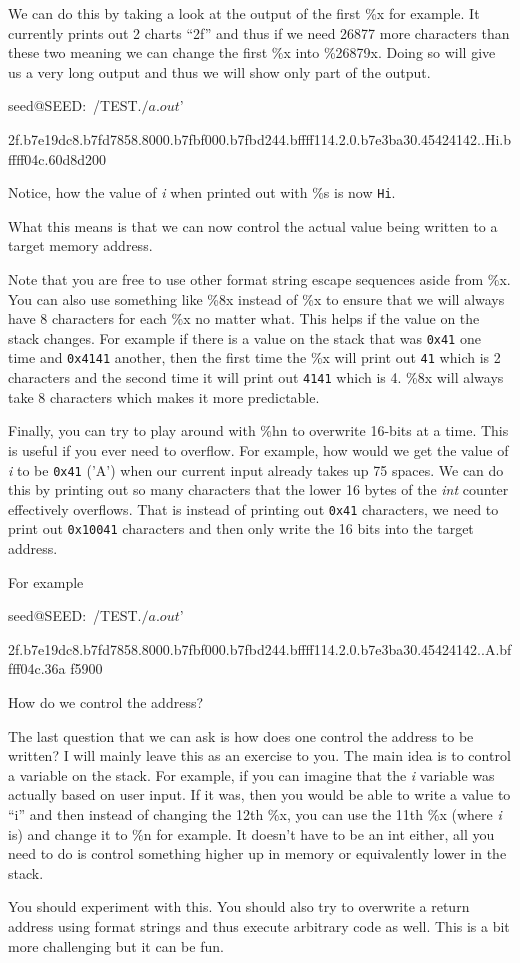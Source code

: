 We can do this by taking a look at the output of the first \%x for example. It currently prints out 2 charts “2f” and thus if we need 26877 more characters than these two meaning we can change 
the first \%x into \%26879x. Doing so will give us a very long output and thus we will show only part of the output. 
\begin{code} 
seed@SEED:~/TEST$ ./a.out $'%
 
2f.b7e19dc8.b7fd7858.8000.b7fbf000.b7fbd244.bffff114.2.0.b7e3ba30.45424142..Hi.bffff04c.60d8d200 
\end{code} 
Notice, how the value of {\em i} when printed out with \%s is now {\tt Hi}.  
 
What this means is that we can now control the actual value being written to a target memory address.  
 
Note that you are free to use other format string escape sequences aside from \%x. You can also use something like \%8x instead of \%x to ensure that we will always have 8 characters for each \%x no matter what. This helps if the value on the stack changes. For example if there is a value on the stack that was {\tt 0x41} one time and {\tt 0x4141} another, then the first time the \%x will print out {\tt 41} which is 2 characters and the second time it will print out {\tt 4141} which is 4. \%8x will always take 8 characters which makes it more predictable. 
 
Finally, you can try to play around with \%hn to overwrite 16-bits at a time. This is useful if you ever need to overflow. For example, how would we get the value of {\em i} to be {\tt 0x41} ('A') when our current input already takes up 75 spaces. We can do this by printing out so many characters that the lower 16 bytes of the {\em int} counter effectively overflows. That is instead of printing out {\tt 0x41} characters, we need to print out {\tt 0x10041} characters and then only write the 16 bits into the target address. 
 
For example 
\begin{code} 
seed@SEED:~/TEST$ ./a.out $'%
 
2f.b7e19dc8.b7fd7858.8000.b7fbf000.b7fbd244.bffff114.2.0.b7e3ba30.45424142..A.bffff04c.36a 
f5900 
\end{code} 

How do we control the address? 
 
The last question that we can ask is how does one control the address to be written? I will mainly leave this as an exercise to you. The main idea is to control a variable on the stack. For example, if you can imagine that the {\em i} variable was actually based on user input. If it was, then you would be able to write a value to “i” and then instead of changing the 12th \%x, you can use the 11th \%x (where {\em i} is) and change it to \%n for example. It doesn't have to be an int either, all you need to do is control something higher up in memory or equivalently lower in the stack. 
 
You should experiment with this. You should also try to overwrite a return address using format strings and thus execute arbitrary code as well. This is a bit more challenging but it can be fun. 
